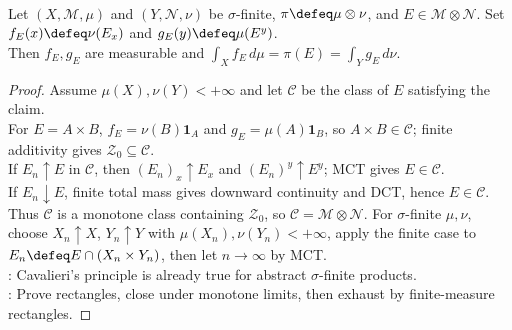 \begin{proposition} \label{prop:section-measures-integrate-to-product-measure} \\
Let $(X,\mathcal{M},\mu)$ and $(Y,\mathcal{N},\nu)$ be $\sigma$-finite, $\pi\defeq\mu\otimes\nu$, and $E\in\mathcal{M}\otimes\mathcal{N}$. Set $f_E(x)\defeq\nu(E_x)$ and $g_E(y)\defeq\mu(E^y)$.\\
Then $f_E,g_E$ are measurable and $\int_Xf_E\,d\mu=\pi(E)=\int_Yg_E\,d\nu$.
\begin{proof}
Assume $\mu(X),\nu(Y)<+\infty$ and let $\mathcal{C}$ be the class of $E$ satisfying the claim.\\
For $E=A\times B$, $f_E=\nu(B)\mathbf{1}_A$ and $g_E=\mu(A)\mathbf{1}_B$, so $A\times B\in\mathcal{C}$; finite additivity gives $\mathcal{Z}_0\subseteq\mathcal{C}$.\\
If $E_n\uparrow E$ in $\mathcal{C}$, then $(E_n)_x\uparrow E_x$ and $(E_n)^y\uparrow E^y$; MCT gives $E\in\mathcal{C}$.\\
If $E_n\downarrow E$, finite total mass gives downward continuity and DCT, hence $E\in\mathcal{C}$.\\
Thus $\mathcal{C}$ is a monotone class containing $\mathcal{Z}_0$, so $\mathcal{C}=\mathcal{M}\otimes\mathcal{N}$. For $\sigma$-finite $\mu,\nu$, choose $X_n\uparrow X$, $Y_n\uparrow Y$ with $\mu(X_n),\nu(Y_n)<+\infty$, apply the finite case to $E_n\defeq E\cap(X_n\times Y_n)$, then let $n\to\infty$ by MCT.\\
: Cavalieri's principle is already true for abstract $\sigma$-finite products.\\
: Prove rectangles, close under monotone limits, then exhaust by finite-measure rectangles.
\end{proof}
\end{proposition}

